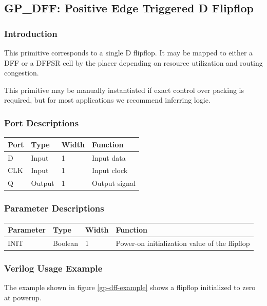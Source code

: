 \documentclass[11pt]{article}
\begin{document}
\pagebreak
\subsection{GP\_DFF: Positive Edge Triggered D Flipflop}

\subsubsection{Introduction}
This primitive corresponds to a single D flipflop. It may be mapped to either a DFF or a DFFSR cell by the placer 
depending on resource utilization and routing congestion.

This primitive may be manually instantiated if exact control over packing is required, but for most applications we 
recommend inferring logic.

\subsubsection{Port Descriptions}

\begin{tabularx}{4in}{|l|l|l|X|}
\hline
{\bfseries Port} & {\bfseries Type} & {\bfseries Width} & {\bfseries Function} \\
\hline
D & Input & 1 & Input data \\
\hline
CLK & Input & 1 & Input clock \\
\hline
Q & Output & 1 & Output signal \\
\hline
\end{tabularx}

\subsubsection{Parameter Descriptions}

\begin{tabularx}{5in}{|l|l|l|X|}
\hline
{\bfseries Parameter} & {\bfseries Type} & {\bfseries Width} & {\bfseries Function} \\
\hline
INIT & Boolean & 1 & Power-on initialization value of the flipflop \\
\hline
\end{tabularx}

\subsubsection{Verilog Usage Example}

The example shown in figure \ref{gp-dff-example} shows a flipflop initialized to zero at powerup.
\end{document}
